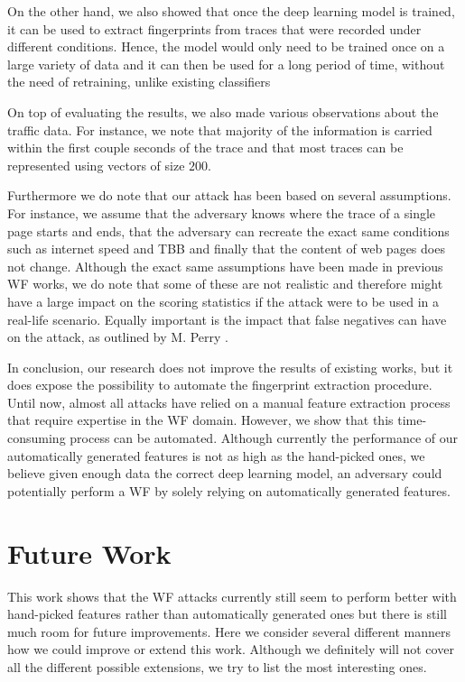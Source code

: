 On the other hand, we also showed that once the deep learning model is trained, it can be used to extract fingerprints from traces that were recorded under different conditions.
Hence, the model would only need to be trained once on a large variety of data and it can then be used for a long period of time, without the need of retraining, unlike existing classifiers

On top of evaluating the results, we also made various observations about the traffic data.
For instance, we note that majority of the information is carried within the first couple seconds of the trace and that most traces can be represented using vectors of size $200$.

\newpage

Furthermore we do note that our attack has been based on several assumptions.
For instance, we assume that the adversary knows where the trace of a single page starts and ends, that the adversary can recreate the exact same conditions such as internet speed and TBB and finally that the content of web pages does not change.
Although the exact same assumptions have been made in previous WF works, we do note that some of these are not realistic and therefore might have a large impact on the scoring statistics if the attack were to be used in a real-life scenario.
Equally important is the impact that false negatives can have on the attack, as outlined by M. Perry \cite{wfpcritique}.

In conclusion, our research does not improve the results of existing works, but it does expose the possibility to automate the fingerprint extraction procedure.
Until now, almost all attacks have relied on a manual feature extraction process that require expertise in the WF domain.
However, we show that this time-consuming process can be automated.
Although currently the performance of our automatically generated features is not as high as the hand-picked ones, we believe given enough data the correct deep learning model, an adversary could potentially perform a WF by solely relying on automatically generated features.

\section{Future Work} \label{sec:future-works}

This work shows that the WF attacks currently still seem to perform better with hand-picked features rather than automatically generated ones but there is still much room for future improvements.
Here we consider several different manners how we could improve or extend this work.
Although we definitely will not cover all the different possible extensions, we try to list the most interesting ones.


